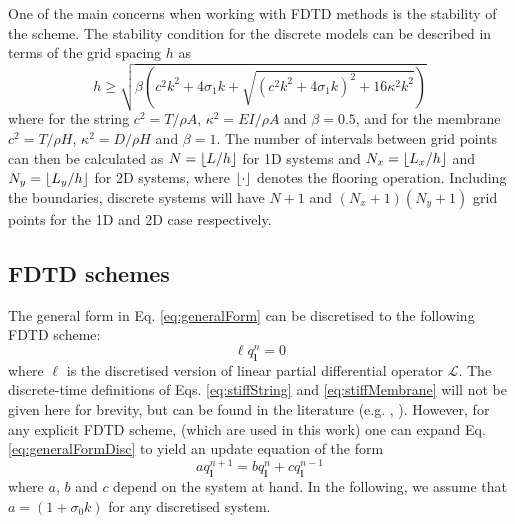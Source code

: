 \documentclass{article}
\begin{document}
One of the main concerns when working with FDTD methods is the stability of the scheme. The stability condition for the discrete models can be described in terms of the grid spacing $h$ as \cite{WillemsenThesis}
\begin{equation}\label{eq:stability}
    h\geq \sqrt{\beta\left(c^2k^2 + 4 \sigma_1k+\sqrt{(c^2k^2 + 4 \sigma_1k)^2 + 16 \kappa^2k^2}\right)}
\end{equation}
where for the string $c^2 = T/\rho A$, $\kappa^2 = EI/\rho A$ and $\beta = 0.5$, and for the membrane $c^2 = T / \rho H$, $\kappa^2 = D/\rho H$ and $\beta = 1$. The number of intervals between grid points can then be calculated as $N = \floor[L/h]$ for 1D systems and $N_x = \floor[L_x/h]$ and $N_y = \floor[L_y/h]$ for 2D systems, where $\floor[\cdot]$ denotes the flooring operation. Including the boundaries, discrete systems will have $N+1$ and $(N_x+1)(N_y+1)$ grid points for the 1D and 2D case respectively. 


\subsection{FDTD schemes}
The general form in Eq. \eqref{eq:generalForm} can be discretised to the following FDTD scheme:
\begin{equation}\label{eq:generalFormDisc}
    \ell q_{\boldsymbol{l}}^n = 0
\end{equation}
where $\ell$ is the discretised version of linear partial differential operator $\mathcal{L}$. The discrete-time definitions of Eqs. \eqref{eq:stiffString} and \eqref{eq:stiffMembrane} will not be given here for brevity, but can be found in the literature (e.g. \cite{theBible}, \cite{WillemsenThesis}). However, for any explicit FDTD scheme, (which are used in this work) one can expand Eq.  \eqref{eq:generalFormDisc} to yield an update equation of the form
\begin{equation}\label{eq:generalUpdate}
    a q_{\boldsymbol{l}}^{n+1} = b q_{\boldsymbol{l}}^n + c q_{\boldsymbol{l}}^{n-1}
\end{equation}
where $a$, $b$ and $c$ depend on the system at hand. In the following, we assume that $a = (1+\sigma_0 k)$ for any discretised system.

\end{document}
